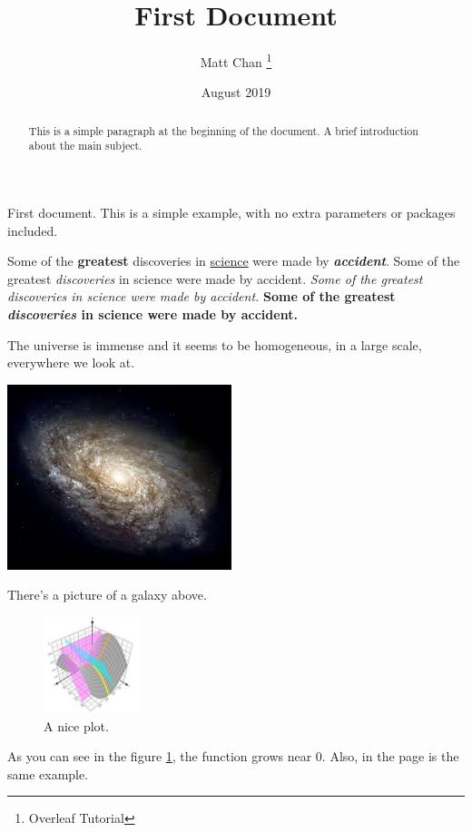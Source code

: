 \documentclass{report}
\title{First Document}
\author{Matt Chan \thanks{Overleaf Tutorial}}
\date{August 2019}
\begin{document}
\maketitle

\begin{abstract}
This is a simple paragraph at the beginning of the document. A brief introduction about the main subject.    
\end{abstract}

First document. This is a simple example, with no extra parameters or packages included.

Some of the \textbf{greatest} discoveries in \underline{science} were made by \textbf{\textit{accident}}.
Some of the greatest \emph{discoveries} in science were made by accident.
\textit{Some of the greatest \emph{discoveries} in science were made by accident.}
\textbf{Some of the greatest \emph{discoveries} in science were made by accident.}

The universe is immense and it seems to be homogeneous, in a large scale, everywhere we look at.

\includegraphics{image/galaxy.jpg}

There's a picture of a galaxy above.

\begin{figure}[h]
    \centering
    \includegraphics[width=0.25\textwidth]{image/graph.jpg}
    \caption{A nice plot.}
    \label{fig:plot1}
\end{figure}

As you can see in the figure \ref{fig:plot1}, the function grows near 0. Also, in the page \pageref{fig:plot1} is the same example.
\end{document}
